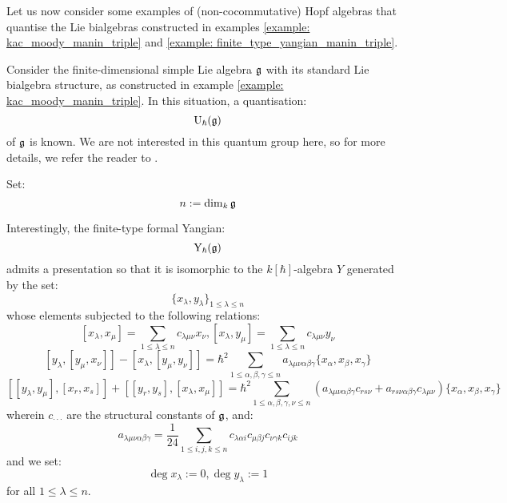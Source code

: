         Let us now consider some examples of (non-cocommutative) Hopf algebras that quantise the Lie bialgebras constructed in examples \ref{example: kac_moody_manin_triple} and \ref{example: finite_type_yangian_manin_triple}.
        \begin{example} \label{example: finite_type_QUEs}
            Consider the finite-dimensional simple Lie algebra $\mathfrak{g}$ with its standard Lie bialgebra structure, as constructed in example \ref{example: kac_moody_manin_triple}. In this situation, a quantisation:
                $$\mathrm{U}_{\hbar}(\mathfrak{g})$$
            of $\mathfrak{g}$ is known. We are not interested in this quantum group here, so for more details, we refer the reader to \cite[Section XVII.2]{kassel_quantum_groups}. 
        \end{example}
        \begin{example} \label{example: finite_type_yangians}
            Set:
                $$n := \dim_k \mathfrak{g}$$
        
            Interestingly, the finite-type formal Yangian:
                $$\mathrm{Y}_{\hbar}(\mathfrak{g})$$
            admits a presentation so that it is isomorphic to the $k[\hbar]$-algebra $Y$ generated by the set:
                $$\{ x_{\lambda}, y_{\lambda} \}_{1 \leq \lambda \leq n}$$
            whose elements subjected to the following relations:
                $$[ x_{\lambda}, x_{\mu} ] = \sum_{1 \leq \lambda \leq n} c_{\lambda \mu \nu} x_{\nu}, [ x_{\lambda}, y_{\mu} ] = \sum_{1 \leq \lambda \leq n} c_{\lambda \mu \nu} y_{\nu}$$
                $$[ y_{\lambda}, [y_{\mu}, x_{\nu}] ] - [ x_{\lambda}, [y_{\mu}, y_{\nu}] ] = \hbar^2 \sum_{1 \leq \alpha, \beta, \gamma \leq n} a_{\lambda \mu \nu \alpha \beta \gamma} \{ x_{\alpha}, x_{\beta}, x_{\gamma} \}$$
                $$[ [y_{\lambda}, y_{\mu}], [x_r, x_s] ] + [ [y_r, y_s], [x_{\lambda}, x_{\mu}] ] = \hbar^2 \sum_{1 \leq \alpha, \beta, \gamma, \nu \leq n} ( a_{\lambda \mu \nu \alpha \beta \gamma} c_{r s \nu} + a_{r s \nu \alpha \beta \gamma} c_{\lambda \mu \nu} ) \{ x_{\alpha}, x_{\beta}, x_{\gamma} \}$$
            wherein $c_{\cdot \cdot \cdot}$ are the structural constants of $\mathfrak{g}$, and:
                $$a_{\lambda \mu \nu \alpha \beta \gamma} = \frac{1}{24} \sum_{1 \leq i, j, k \leq n} c_{\lambda \alpha i} c_{\mu \beta j} c_{\nu \gamma k} c_{i j k}$$
            and we set:
                $$\deg x_{\lambda} := 0, \deg y_{\lambda} := 1$$
            for all $1 \leq \lambda \leq n$.
            

\end{example}
